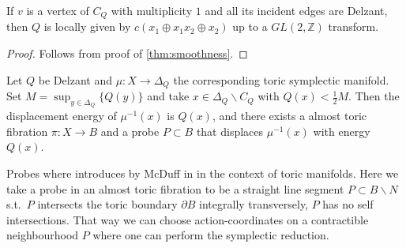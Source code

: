 \documentclass[12pt,a4paper,abstract=true,draft]{scrartcl}
\begin{document}
\begin{lemma}
  \label{thm:tropical_line}
  If $v$ is a vertex of $C_Q$ with multiplicity $1$ and all its incident edges are Delzant, then $Q$ is locally given by $c(x_1 ⊕ x_1 x_2 ⊕ x_2)$ up to a $GL(2,ℤ)$ transform.
\end{lemma}

\begin{proof}
  Follows from proof of \cref{thm:smoothness}.
\end{proof}

\begin{theorem}
  \label{thm:displacing}
  Let $Q$ be Delzant and $μ\colon X → Δ_Q$ the corresponding toric symplectic manifold.
  Set $M = \sup_{y ∈ Δ_Q}\{Q(y)\}$ and take $x ∈ Δ_Q ∖ C_Q$ with $Q(x) < \frac{1}{2} M$.
  Then the displacement energy of $μ^{-1}(x)$ is $Q(x)$, and there exists a almost toric fibration $π\colon X → B$ and a probe $P ⊂ B$ that displaces $μ^{-1}(x)$ with energy $Q(x)$.
\end{theorem}

Probes where introduces by McDuff in \cite{mcduff2011displacing} in the context of toric manifolds.
Here we take a probe in an almost toric fibration to be a straight line segment $P ⊂ B ∖ N$ s.t.\ $P$ intersects the toric boundary $∂B$ integrally transversely, $P$ has no self intersections.
That way we can choose action-coordinates on a contractible neighbourhood $P$ where one can perform the symplectic reduction.
\end{document}
